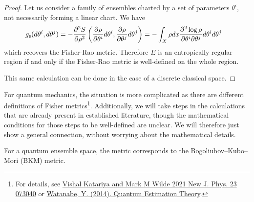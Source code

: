 \begin{mathSection}
\begin{proof}
	Let us consider a family of ensembles charted by a set of parameters $\theta^i$, not necessarily forming a linear chart. We have
	\begin{equation}
		\begin{aligned}
			g_{\mathsf{e}}(d\theta^i, d\theta^j) &= - \frac{\partial^2 S}{\partial \rho^2}\left(\frac{\partial 
				\rho}{\partial \theta^i} d\theta^i, \frac{\partial 
				\rho}{\partial \theta^j} d\theta^j\right) = - \int_X \rho dx \frac{\partial^2 \log \rho}{\partial \theta^i \partial \theta^j}d\theta^i d\theta^j
		\end{aligned}
	\end{equation}
	which recovers the Fisher-Rao metric. Therefore $E$ is an entropically regular region if and only if the Fisher-Rao metric is well-defined on the whole region.
	
	This same calculation can be done in the case of a discrete classical space.
\end{proof}

\begin{remark}
	For quantum mechanics, the situation is more complicated as there are different definitions of Fisher metrics\footnote{For details, see \href{https://iopscience.iop.org/article/10.1088/1367-2630/ac1186}{Vishal Katariya and Mark M Wilde 2021 New J. Phys. 23 073040} or \href{https://link.springer.com/chapter/10.1007/978-4-431-54493-7_4}{Watanabe, Y. (2014). Quantum Estimation Theory}.}. Additionally, we will take steps in the calculations that are already present in established literature, though the mathematical conditions for those steps to be well-defined are unclear. We will therefore just show a general connection, without worrying about the mathematical details.
	
\end{remark}

\begin{prop}
	For a quantum ensemble space, the metric corresponds to the Bogoliubov–Kubo–Mori (BKM) metric.
\end{prop}


\end{mathSection}

